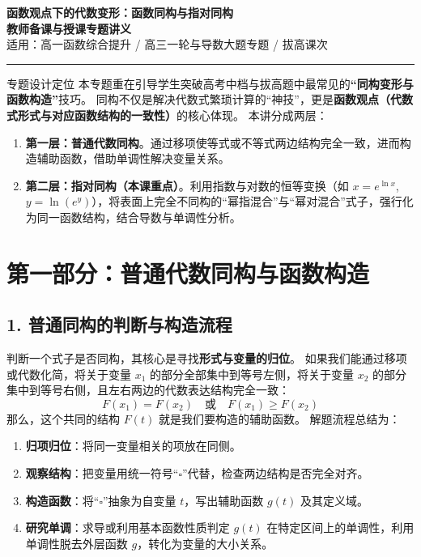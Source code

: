 \documentclass[11pt,a4paper]{ctexart}
\begin{document}
\begin{center}
  {\bfseries 函数观点下的代数变形：函数同构与指对同构}\\[3mm]
  {\Large \bfseries 教师备课与授课专题讲义}\\[2mm]
  {\large 适用：高一函数综合提升 / 高三一轮与导数大题专题 / 拔高课次}\\[2mm]
  \rule{0.85\linewidth}{0.5pt}
\end{center}

\begin{teachbox}{专题设计定位}
本专题重在引导学生突破高考中档与拔高题中最常见的\textbf{“同构变形与函数构造”}技巧。
同构不仅是解决代数式繁琐计算的“神技”，更是\textbf{函数观点（代数式形式与对应函数结构的一致性）}的核心体现。
本讲分成两层：
\begin{enumerate}
  \item \textbf{第一层：普通代数同构}。通过移项使等式或不等式两边结构完全一致，进而构造辅助函数，借助单调性解决变量关系。
  \item \textbf{第二层：指对同构（本课重点）}。利用指数与对数的恒等变换（如 $x=e^{\ln x}$, $y=\ln(e^y)$），将表面上完全不同构的“幂指混合”与“幂对混合”式子，强行化为同一函数结构，结合导数与单调性分析。
\end{enumerate}
\end{teachbox}

\newpage

\section{第一部分：普通代数同构与函数构造}

\subsection{1. 普通同构的判断与构造流程}
判断一个式子是否同构，其核心是寻找\textbf{形式与变量的归位}。
如果我们能通过移项或代数化简，将关于变量 $x_1$ 的部分全部集中到等号左侧，将关于变量 $x_2$ 的部分集中到等号右侧，且左右两边的代数表达结构完全一致：
\[
F(x_1) = F(x_2) \quad \text{或} \quad F(x_1) \ge F(x_2)
\]
那么，这个共同的结构 $F(t)$ 就是我们要构造的辅助函数。
解题流程总结为：
\begin{enumerate}
  \item \textbf{归项归位}：将同一变量相关的项放在同侧。
  \item \textbf{观察结构}：把变量用统一符号“$\square$”代替，检查两边结构是否完全对齐。
  \item \textbf{构造函数}：将“$\square$”抽象为自变量 $t$，写出辅助函数 $g(t)$ 及其定义域。
  \item \textbf{研究单调}：求导或利用基本函数性质判定 $g(t)$ 在特定区间上的单调性，利用单调性脱去外层函数 $g$，转化为变量的大小关系。
\end{enumerate}
\end{document}
